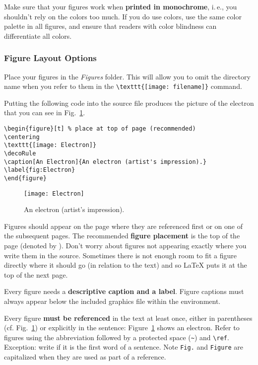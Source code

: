 Make sure that your figures work when \textbf{printed in monochrome}, i.\,e., you shouldn't rely on the colors too much. If you do use colors, use the same color palette in all figures, and ensure that readers with color blindness can differentiate all colors.

\subsubsection{Figure Layout Options}

Place your figures in the \emph{Figures} folder. This will allow you to omit the directory name when you refer to them in the \verb|\texttt{[image: filename]}| command.

Putting the following code into the source file produces the picture of the electron that you can see in Fig.~\ref{fig:Electron}.
\begin{lstlisting}[language={[LaTeX]TeX}]
\begin{figure}[t] % place at top of page (recommended)
\centering
\texttt{[image: Electron]}
\decoRule
\caption[An Electron]{An electron (artist's impression).}
\label{fig:Electron}
\end{figure}
\end{lstlisting}

\begin{figure}[t] %
\centering
\texttt{[image: Electron]}
\decoRule
\caption[An Electron]{An electron (artist's impression).}
\label{fig:Electron}
\end{figure}

Figures should appear on the page where they are referenced first or on one of the subsequent pages. The recommended \textbf{figure placement} is the top of the page (denoted by \code{[t]}). Don't worry about figures not appearing exactly where you write them in the source. Sometimes there is not enough room to fit a figure directly where it should go (in relation to the text) and so LaTeX puts it at the top of the next page.

Every figure needs a \textbf{descriptive caption and a label}. Figure captions must always appear below the included graphics file within the  environment.

Every figure \textbf{must be referenced} in the text at least once, either in parentheses (cf. Fig.~\ref{fig:Electron}) or explicitly in the sentence: Figure~\ref{fig:Electron} shows an electron. Refer to figures using the abbreviation  followed by a protected space (\verb|~|) and \verb|\ref|. Exception: write  if it is the first word of a sentence. Note \verb|Fig.| and \verb|Figure| are capitalized when they are used as part of a reference.

